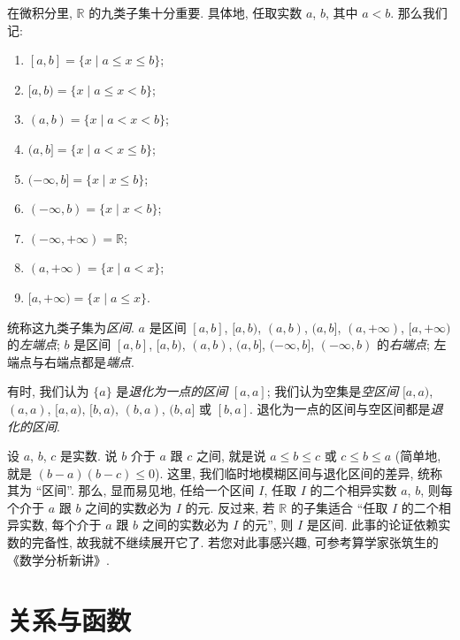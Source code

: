 \begin{definition}
    在微积分里, $\mathbb{R}$ 的九类子集十分重要. 具体地, 任取实数 $a$, $b$, 其中 $a < b$. 那么我们记:
    \begin{enumerate}
        \item $[a, b] = \{ x \mid a \leq x \leq b \}$;
        \item $[a, b) = \{ x \mid a \leq x < b \}$;
        \item $(a, b) = \{ x \mid a < x < b \}$;
        \item $(a, b] = \{ x \mid a < x \leq b \}$;
        \item $(-\infty, b] = \{ x \mid x \leq b \}$;
        \item $(-\infty, b) = \{ x \mid x < b \}$;
        \item $(-\infty, +\infty) = \mathbb{R}$;
        \item $(a, +\infty) = \{ x \mid a < x \}$;
        \item $[a, +\infty) = \{ x \mid a \leq x \}$.
    \end{enumerate}
    统称这九类子集为\emph{区间}. $a$ 是区间 $[a, b]$, $[a, b)$, $(a, b)$, $(a, b]$, $(a, +\infty)$, $[a, +\infty)$ 的\emph{左端点}; $b$ 是区间 $[a, b]$, $[a, b)$, $(a, b)$, $(a, b]$, $(-\infty, b]$, $(-\infty, b)$ 的\emph{右端点}; 左端点与右端点都是\emph{端点}.

    有时, 我们认为 $\{ a \}$ 是\emph{退化为一点的区间} $[a, a]$; 我们认为空集是\emph{空区间} $[a, a)$, $(a, a)$, $[a, a)$, $[b, a)$, $(b, a)$, $(b, a]$ 或 $[b, a]$. 退化为一点的区间与空区间都是\emph{退化的区间}.
\end{definition}

\begin{remark}
    设 $a$, $b$, $c$ 是实数. 说 $b$ 介于 $a$ 跟 $c$ 之间, 就是说 $a \leq b \leq c$ 或 $c \leq b \leq a$ (简单地, 就是 $(b - a)(b - c) \leq 0$). 这里, 我们临时地模糊区间与退化区间的差异, 统称其为 ``区间''. 那么, 显而易见地, 任给一个区间 $I$, 任取 $I$ 的二个相异实数 $a$, $b$, 则每个介于 $a$ 跟 $b$ 之间的实数必为 $I$ 的元. 反过来, 若 $\mathbb{R}$ 的子集适合 ``任取 $I$ 的二个相异实数, 每个介于 $a$ 跟 $b$ 之间的实数必为 $I$ 的元'', 则 $I$ 是区间. 此事的论证依赖实数的完备性, 故我就不继续展开它了. 若您对此事感兴趣, 可参考算学家张筑生的《数学分析新讲》.
\end{remark}

\section{关系与函数}

